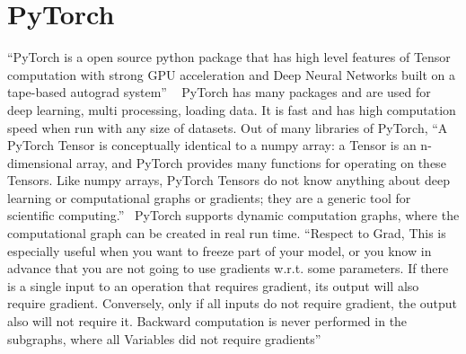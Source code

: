 \section{PyTorch}

“PyTorch is a open source python package that has high level features of 
Tensor computation with strong GPU acceleration and Deep 
Neural Networks built on a tape-based autograd system”
~\cite{hid-sp18-520-PyTorch}
PyTorch has many packages and are used for deep learning, multi processing,
loading data. It is fast and has high computation speed when run with any size 
of datasets.
Out of many libraries of PyTorch, “A PyTorch Tensor is conceptually identical 
to a numpy array: a Tensor is an n-dimensional array, and PyTorch provides many
functions for operating on these Tensors. Like numpy arrays, PyTorch Tensors do 
not know anything about deep learning or computational graphs or gradients; they
are a generic tool for scientific computing.”~\cite{hid-sp18-520-PyTorchtensor}
PyTorch supports dynamic computation graphs, where the computational graph can 
be created in real run time.
“Respect to Grad, This is especially useful when you want to freeze part of your
model, or you know in advance that you are not going to use gradients w.r.t. 
some parameters. If there is a single input to an operation that requires 
gradient, its output will also require gradient. Conversely, only if all inputs 
do not require gradient, the output also will not require it. Backward 
computation is never performed in the subgraphs, where all Variables did not 
require gradients”~\cite{hid-sp18-520-PyTorchgrad}